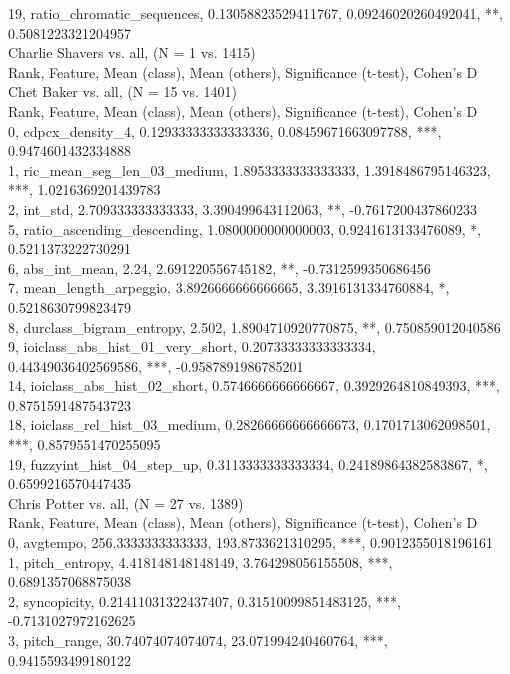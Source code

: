 19, ratio_chromatic_sequences, 0.13058823529411767, 0.09246020260492041, **, 0.5081223321204957\\
Charlie Shavers vs. all, (N = 1 vs. 1415)\\
Rank, Feature, Mean (class), Mean (others), Significance (t-test), Cohen's D\\
Chet Baker vs. all, (N = 15 vs. 1401)\\
Rank, Feature, Mean (class), Mean (others), Significance (t-test), Cohen's D\\
0, cdpcx_density_4, 0.12933333333333336, 0.08459671663097788, ***, 0.9474601432334888\\
1, ric_mean_seg_len_03_medium, 1.8953333333333333, 1.3918486795146323, ***, 1.0216369201439783\\
2, int_std, 2.709333333333333, 3.390499643112063, **, -0.7617200437860233\\
5, ratio_ascending_descending, 1.0800000000000003, 0.9241613133476089, *, 0.5211373222730291\\
6, abs_int_mean, 2.24, 2.691220556745182, **, -0.7312599350686456\\
7, mean_length_arpeggio, 3.8926666666666665, 3.3916131334760884, *, 0.5218630799823479\\
8, durclass_bigram_entropy, 2.502, 1.8904710920770875, **, 0.750859012040586\\
9, ioiclass_abs_hist_01_very_short, 0.20733333333333334, 0.44349036402569586, ***, -0.9587891986785201\\
14, ioiclass_abs_hist_02_short, 0.5746666666666667, 0.3929264810849393, ***, 0.8751591487543723\\
18, ioiclass_rel_hist_03_medium, 0.28266666666666673, 0.1701713062098501, ***, 0.8579551470255095\\
19, fuzzyint_hist_04_step_up, 0.3113333333333334, 0.24189864382583867, *, 0.6599216570447435\\
Chris Potter vs. all, (N = 27 vs. 1389)\\
Rank, Feature, Mean (class), Mean (others), Significance (t-test), Cohen's D\\
0, avgtempo, 256.3333333333333, 193.8733621310295, ***, 0.9012355018196161\\
1, pitch_entropy, 4.418148148148149, 3.764298056155508, ***, 0.6891357068875038\\
2, syncopicity, 0.21411031322437407, 0.31510099851483125, ***, -0.7131027972162625\\
3, pitch_range, 30.74074074074074, 23.071994240460764, ***, 0.9415593499180122\\
